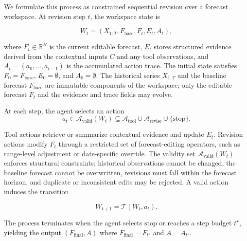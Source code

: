 \documentclass{article}
\theoremstyle{plain}
\theoremstyle{definition}
\theoremstyle{remark}
\begin{document}
We formulate this process as constrained sequential revision over a forecast workspace. At revision step \(t\), the workspace state is

\begin{equation}
    W_t = (X_{1:T}, F_{\text{base}}, F_t, E_t, A_t),
\end{equation}

where \(F_t \in \mathbb{R}^{H}\) is the current editable forecast, \(E_t\) stores structured evidence derived from the contextual inputs \(C\) and any tool observations, and \(A_t = (a_0,\dots,a_{t-1})\) is the accumulated action trace. The initial state satisfies \(F_0 = F_{\text{base}}\), \(E_0 = \emptyset\), and \(A_0 = \emptyset\). The historical series \(X_{1:T}\) and the baseline forecast \(F_{\text{base}}\) are immutable components of the workspace; only the editable forecast \(F_t\) and the evidence and trace fields may evolve.

At each step, the agent selects an action
\begin{equation}
    a_t \in \mathcal{A}_{\text{valid}}(W_t) \subseteq \mathcal{A}_{\text{tool}} \cup \mathcal{A}_{\text{revise}} \cup \{\text{stop}\}.
\end{equation}

Tool actions retrieve or summarize contextual evidence and update \(E_t\). Revision actions modify \(F_t\) through a restricted set of forecast-editing operators, such as range-level adjustment or date-specific override. The validity set \(\mathcal{A}_{\text{valid}}(W_t)\) enforces structural constraints: historical observations cannot be changed, the baseline forecast cannot be overwritten, revisions must fall within the forecast horizon, and duplicate or inconsistent edits may be rejected. A valid action induces the transition

\begin{equation}
    W_{t+1} = \mathcal{T}(W_t, a_t).
\end{equation}

The process terminates when the agent selects $\text{stop}$ or reaches a step budget $t^\star$, yielding the output $(F_{\text{final}}, A)$ where $F_{\text{final}} = F_{t^\star}$ and $A = A_{t^\star}$.


\end{document}
